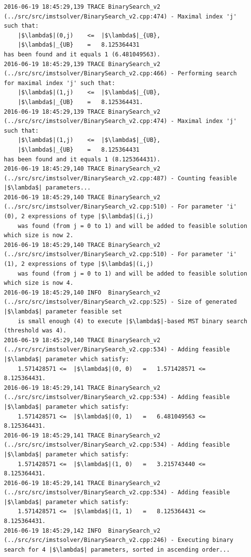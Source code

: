 \begin{verbatim}
2016-06-19 18:45:29,139 TRACE BinarySearch_v2 (../src/src/imstsolver/BinarySearch_v2.cpp:474) - Maximal index 'j' such that:
	|$\lambda$|(0,j)	<=	|$\lambda$|_{UB},
	|$\lambda$|_{UB}	=	8.125364431
has been found and it equals 1 (6.481049563).
2016-06-19 18:45:29,139 TRACE BinarySearch_v2 (../src/src/imstsolver/BinarySearch_v2.cpp:466) - Performing search for maximal index 'j' such that:
	|$\lambda$|(1,j)	<=	|$\lambda$|_{UB},
	|$\lambda$|_{UB}	=	8.125364431.
2016-06-19 18:45:29,139 TRACE BinarySearch_v2 (../src/src/imstsolver/BinarySearch_v2.cpp:474) - Maximal index 'j' such that:
	|$\lambda$|(1,j)	<=	|$\lambda$|_{UB},
	|$\lambda$|_{UB}	=	8.125364431
has been found and it equals 1 (8.125364431).
2016-06-19 18:45:29,140 TRACE BinarySearch_v2 (../src/src/imstsolver/BinarySearch_v2.cpp:487) - Counting feasible |$\lambda$| parameters...
2016-06-19 18:45:29,140 TRACE BinarySearch_v2 (../src/src/imstsolver/BinarySearch_v2.cpp:510) - For parameter 'i' (0), 2 expressions of type |$\lambda$|(i,j) 
	was found (from j = 0 to 1) and will be added to feasible solution which size is now 2.
2016-06-19 18:45:29,140 TRACE BinarySearch_v2 (../src/src/imstsolver/BinarySearch_v2.cpp:510) - For parameter 'i' (1), 2 expressions of type |$\lambda$|(i,j) 
	was found (from j = 0 to 1) and will be added to feasible solution which size is now 4.
2016-06-19 18:45:29,140 INFO  BinarySearch_v2 (../src/src/imstsolver/BinarySearch_v2.cpp:525) - Size of generated |$\lambda$| parameter feasible set 
	is small enough (4) to execute |$\lambda$|-based MST binary search (threshold was 4).
2016-06-19 18:45:29,140 TRACE BinarySearch_v2 (../src/src/imstsolver/BinarySearch_v2.cpp:534) - Adding feasible |$\lambda$| parameter which satisfy:
	1.571428571	<=	|$\lambda$|(0, 0)	=	1.571428571	<=	8.125364431.
2016-06-19 18:45:29,141 TRACE BinarySearch_v2 (../src/src/imstsolver/BinarySearch_v2.cpp:534) - Adding feasible |$\lambda$| parameter which satisfy:
	1.571428571	<=	|$\lambda$|(0, 1)	=	6.481049563	<=	8.125364431.
2016-06-19 18:45:29,141 TRACE BinarySearch_v2 (../src/src/imstsolver/BinarySearch_v2.cpp:534) - Adding feasible |$\lambda$| parameter which satisfy:
	1.571428571	<=	|$\lambda$|(1, 0)	=	3.215743440	<=	8.125364431.
2016-06-19 18:45:29,141 TRACE BinarySearch_v2 (../src/src/imstsolver/BinarySearch_v2.cpp:534) - Adding feasible |$\lambda$| parameter which satisfy:
	1.571428571	<=	|$\lambda$|(1, 1)	=	8.125364431	<=	8.125364431.
2016-06-19 18:45:29,142 INFO  BinarySearch_v2 (../src/src/imstsolver/BinarySearch_v2.cpp:246) - Executing binary search for 4 |$\lambda$| parameters, sorted in ascending order...

\end{verbatim}
